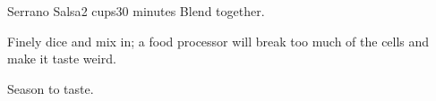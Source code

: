 \documentclass[../Cookbook.tex]{subfiles}
\begin{document}
\begin{recipe}{Serrano Salsa}{2 cups}{30 minutes}
	Blend together.

	Finely dice and mix in; a food processor will break too much of the cells and make it taste weird.

	Season to taste.

\end{recipe}
\end{document}
